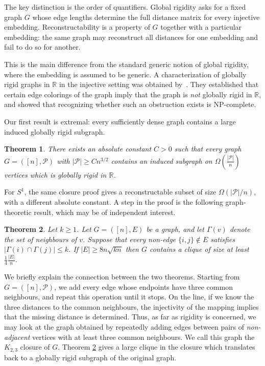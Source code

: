 \documentclass[fullpage,11pt]{article}
\newcommand{\R}{\mathbb{R}}
\theoremstyle{break}
\newtheorem{theorem}{Theorem}
\theoremstyle{definition}
\theoremstyle{break}
\begin{document}
The key distinction is the order of quantifiers. Global rigidity asks for a fixed graph \(G\) whose edge lengths determine the full distance matrix for every injective embedding. Reconstructability is a property of \(G\) together with a particular embedding: the same graph may reconstruct all distances for one embedding and fail to do so for another.

This is the main difference from the standard generic notion of global rigidity, where the embedding is assumed to be generic. A characterization of globally rigid graphs in $\R$ in the injective setting was obtained by~\cite[Theorem~2.4]{GARAMVOLGYI2022112687}. They established that certain edge colorings of the graph imply that the graph is \emph{not} globally rigid in $\R$, and showed that recognizing whether such an obstruction exists is NP-complete.

Our first result is extremal: every sufficiently dense graph contains a large induced globally rigid subgraph.

\begin{theorem}\label{THM : Worst-Case-Bound-Line}
There exists an absolute constant $C>0$ such that every graph $G=([n],\mathcal{P})$ with $|\mathcal{P}| \geq C n^{3/2}$ contains an induced subgraph on  $\Omega\left(\frac{|\mathcal{P}|}{n}\right)$ vertices which is globally rigid in $\mathbb R$.
\end{theorem}

For \(S^1\), the same closure proof gives a reconstructable subset of size
\(\Omega(|\mathcal P|/n)\), with a different absolute constant. A step in the proof is the following graph-theoretic result, which may be of independent
interest.

\begin{theorem}\label{Theorem : Graphs with bounded intersection}
    Let $k\geq1$. Let $G=([n],E)$ be a graph, and let $\Gamma(v)$ denote the set of neighbours of $v$. Suppose that every non-edge $\{i,j\}\notin E$ satisfies $|\Gamma(i) \cap \Gamma(j)| \leq k$. If $|E| \geq 8 n \sqrt{kn}$ then $G$ contains a clique of size at least $\frac{1}{4}\frac{|E|}{n}$.
\end{theorem}


We briefly explain the connection between the two theorems. Starting from
\(G=([n],\mathcal P)\), we add every edge whose endpoints have three common
neighbours, and repeat this operation until it stops. On the line, if we know the three
distances to the common neighbours, the injectivity of the mapping implies that the missing distance is determined. Thus, as far as rigidity is concerned, we may look at the graph obtained by repeatedly adding edges between pairs of \emph{non-adjacent} vertices with at least three common neighbours. We call this graph the $K_{2,3}$ closure of $G$.
Theorem \ref{Theorem : Graphs with bounded intersection} gives a large clique in
the closure which translates back to a globally rigid subgraph of the original graph.
\end{document}
